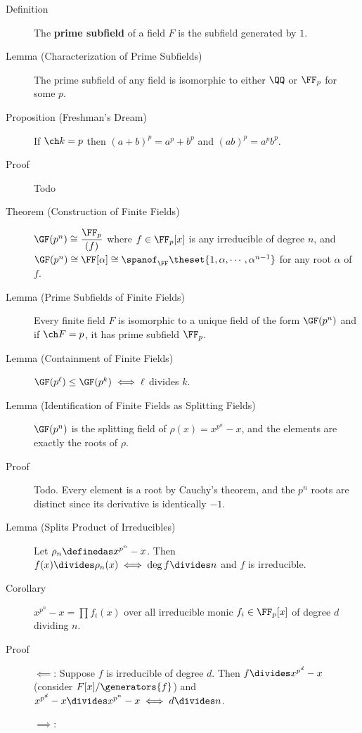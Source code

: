 \begin{description}
\item[Definition]
The \textbf{prime subfield} of a field \(F\) is the subfield generated
by \(1\).
\item[Lemma (Characterization of Prime Subfields)]
The prime subfield of any field is isomorphic to either \(\QQ\) or
\(\FF_p\) for some \(p\).
\item[Proposition (Freshman's Dream)]
If \(\ch k = p\) then \((a+b)^p = a^p + b^p\) and \((ab)^p = a^p b^p\).
\item[Proof]
Todo
\item[Theorem (Construction of Finite Fields)]
\(\GF(p^n)\cong \displaystyle\frac{\FF_p}{(f)}\) where
\(f \in \FF_p[x]\) is any irreducible of degree \(n\), and
\(\GF(p^n) \cong \FF[\alpha] \cong \spanof_\FF\theset{1, \alpha, \cdots, \alpha^{n-1}}\)
for any root \(\alpha\) of \(f\).
\item[Lemma (Prime Subfields of Finite Fields)]
Every finite field \(F\) is isomorphic to a unique field of the form
\(\GF(p^n)\) and if \(\ch F = p\), it has prime subfield \(\FF_p\).
\item[Lemma (Containment of Finite Fields)]
\(\GF(p^\ell) \leq \GF(p^k) \iff \ell\) divides \(k\).
\item[Lemma (Identification of Finite Fields as Splitting Fields)]
\(\GF(p^n)\) is the splitting field of \(\rho(x) = x^{p^n} - x\), and
the elements are exactly the roots of \(\rho\).
\item[Proof]
Todo. Every element is a root by Cauchy's theorem, and the \(p^n\) roots
are distinct since its derivative is identically \(-1\).
\item[Lemma (Splits Product of Irreducibles)]
Let \(\rho_n \definedas x^{p^n} - x\). Then
\(f(x) \divides \rho_n(x) \iff \deg f \divides n\) and \(f\) is
irreducible.
\item[Corollary]
\(x^{p^n} - x = \prod f_i(x)\) over all irreducible monic
\(f_i \in \FF_p[x]\) of degree \(d\) dividing \(n\).
\item[Proof]
\hfill

\(\impliedby\): Suppose \(f\) is irreducible of degree \(d\). Then
\(f \divides x^{p^d} - x\) (consider \(F[x]/\generators{f}\)) and
\(x^{p^d} - x \divides x^{p^n} - x \iff d\divides n\).

\(\implies\):


\end{description}

